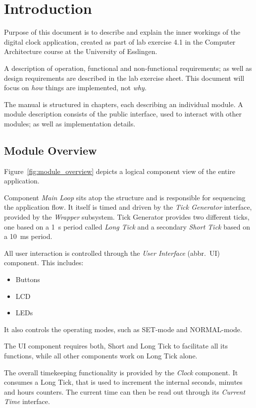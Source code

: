 \chapter{Introduction}

Purpose of this document is to describe and explain the inner workings of the digital clock application, created as part of lab exercise 4.1 in the Computer Architecture course at the University of Esslingen.

A description of operation, functional and non-functional requirements; as well as design requirements are described in the lab exercise sheet. This document will focus on \emph{how} things are implemented, not \emph{why}.

The manual is structured in chapters, each describing an individual module. A module description consists of the public interface, used to interact with other modules; as well as implementation details.

\section{Module Overview}\label{sec:module_overview}

Figure~\ref{fig:module_overview} depicts a logical component view of the entire application.

Component \emph{Main Loop} sits atop the structure and is responsible for sequencing the application flow. It itself is timed and driven by the \emph{Tick Generator} interface, provided by the \emph{Wrapper} subsystem. Tick Generator provides two different ticks, one based on a \SI{1}{\second} period called \emph{Long Tick} and a secondary \emph{Short Tick} based on a \SI{10}{\milli\second} period.

All user interaction is controlled through the \emph{User Interface} (abbr.\ UI) component. This includes:
\begin{itemize}
    \item Buttons
    \item LCD
    \item LEDs
\end{itemize}
It also controls the operating modes, such as SET-mode and NORMAL-mode.

The UI component requires both, Short and Long Tick to facilitate all its functions, while all other components work on Long Tick alone.

The overall timekeeping functionality is provided by the \emph{Clock} component. It consumes a Long Tick, that is used to increment the internal seconds, minutes and hours counters. The current time can then be read out through its \emph{Current Time} interface.


